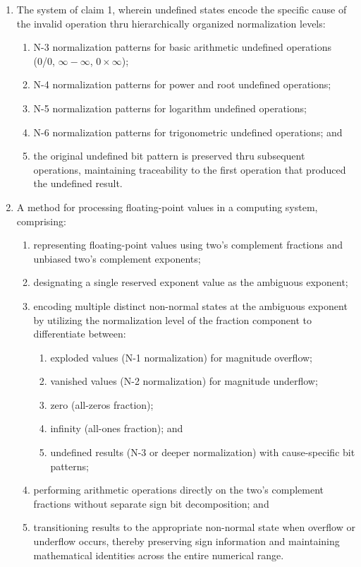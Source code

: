 \documentclass[12pt,letter]{article}
\begin{document}
\begin{enumerate}
    \item The system of claim 1, wherein undefined states encode the specific cause of the invalid operation thru hierarchically organized normalization levels:
        \begin{enumerate}
            \item N-3 normalization patterns for basic arithmetic undefined operations (0/0, $\infty - \infty$, $0 \times \infty$);
            \item N-4 normalization patterns for power and root undefined operations;
            \item N-5 normalization patterns for logarithm undefined operations;
            \item N-6 normalization patterns for trigonometric undefined operations; and
            \item the original undefined bit pattern is preserved thru subsequent operations, maintaining traceability to the first operation that produced the undefined result.
        \end{enumerate}
\newpage

    \item A method for processing floating-point values in a computing system, comprising:
        \begin{enumerate}
            \item representing floating-point values using two's complement fractions and unbiased two's complement exponents;
            \item designating a single reserved exponent value as the ambiguous exponent;
            \item encoding multiple distinct non-normal states at the ambiguous exponent by utilizing the normalization level of the fraction component to differentiate between:
                \begin{enumerate}
                    \item exploded values (N-1 normalization) for magnitude overflow;
                    \item vanished values (N-2 normalization) for magnitude underflow;
                    \item zero (all-zeros fraction);
                    \item infinity (all-ones fraction); and
                    \item undefined results (N-3 or deeper normalization) with cause-specific bit patterns;
                \end{enumerate}
            \item performing arithmetic operations directly on the two's complement fractions without separate sign bit decomposition; and
            \item transitioning results to the appropriate non-normal state when overflow or underflow occurs, thereby preserving sign information and maintaining mathematical identities across the entire numerical range.
        \end{enumerate}


\end{enumerate}
\end{document}
